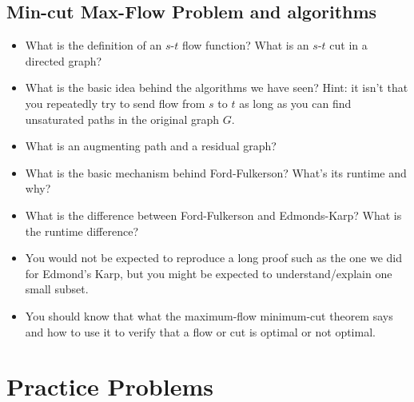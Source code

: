 \documentclass[11  pt]{exam}
\begin{document}
	\subsection{Min-cut Max-Flow Problem and algorithms}

	\begin{itemize}	
		\item What is the definition of an $s$-$t$ flow function? What is an $s$-$t$ cut in a directed graph?
		\item What is the basic idea behind the algorithms we have seen? Hint: it isn't that you repeatedly try to send flow from $s$ to $t$ as long as you can find unsaturated paths in the original graph $G$. 
		\item What is an augmenting path and a residual graph? 
		\item What is the basic mechanism behind Ford-Fulkerson? What's its runtime and why?
		\item What is the difference between Ford-Fulkerson and Edmonds-Karp? What is the runtime difference? 
		\item You would not be expected to reproduce a long proof such as the one we did for Edmond's Karp, but you might be expected to understand/explain one small subset.
		\item You should know that what the maximum-flow minimum-cut theorem says and how to use it to verify that a flow or cut is optimal or not optimal.
	\end{itemize}

	\section{Practice Problems}
	
\end{document}
